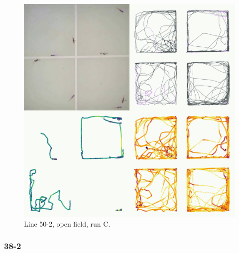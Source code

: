 \documentclass[
]{book}
\begin{document}
\begin{figure}
\includegraphics[width=1\linewidth]{figs/mikk_behaviour/four_panel_plots/open_field_20191120_1150_50-2_R_C_300} \caption{Line 50-2, open field, run C.}\label{fig:4p-50-2-of-C}
\end{figure}

\hypertarget{section-3}{%
\subsubsection{38-2}\label{section-3}}
\end{document}
